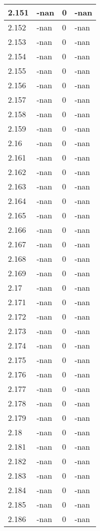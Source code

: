 \documentclass[a4paper,14pt]{extarticle}
\begin{document}
\begin{longtable}{||m{3cm}||m{3cm}|m{3cm}||m{3cm}||}
\hline
2.151 & -nan & 0 & -nan\\
\hline
2.152 & -nan & 0 & -nan\\
\hline
2.153 & -nan & 0 & -nan\\
\hline
2.154 & -nan & 0 & -nan\\
\hline
2.155 & -nan & 0 & -nan\\
\hline
2.156 & -nan & 0 & -nan\\
\hline
2.157 & -nan & 0 & -nan\\
\hline
2.158 & -nan & 0 & -nan\\
\hline
2.159 & -nan & 0 & -nan\\
\hline
2.16 & -nan & 0 & -nan\\
\hline
2.161 & -nan & 0 & -nan\\
\hline
2.162 & -nan & 0 & -nan\\
\hline
2.163 & -nan & 0 & -nan\\
\hline
2.164 & -nan & 0 & -nan\\
\hline
2.165 & -nan & 0 & -nan\\
\hline
2.166 & -nan & 0 & -nan\\
\hline
2.167 & -nan & 0 & -nan\\
\hline
2.168 & -nan & 0 & -nan\\
\hline
2.169 & -nan & 0 & -nan\\
\hline
2.17 & -nan & 0 & -nan\\
\hline
2.171 & -nan & 0 & -nan\\
\hline
2.172 & -nan & 0 & -nan\\
\hline
2.173 & -nan & 0 & -nan\\
\hline
2.174 & -nan & 0 & -nan\\
\hline
2.175 & -nan & 0 & -nan\\
\hline
2.176 & -nan & 0 & -nan\\
\hline
2.177 & -nan & 0 & -nan\\
\hline
2.178 & -nan & 0 & -nan\\
\hline
2.179 & -nan & 0 & -nan\\
\hline
2.18 & -nan & 0 & -nan\\
\hline
2.181 & -nan & 0 & -nan\\
\hline
2.182 & -nan & 0 & -nan\\
\hline
2.183 & -nan & 0 & -nan\\
\hline
2.184 & -nan & 0 & -nan\\
\hline
2.185 & -nan & 0 & -nan\\
\hline
2.186 & -nan & 0 & -nan\\

\end{longtable}
\end{document}
